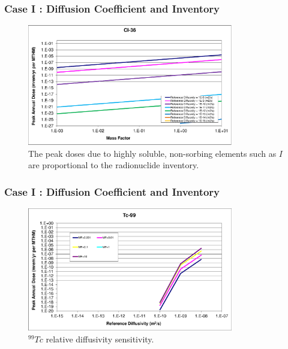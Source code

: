\begin{frame}[c]
  \frametitle{Case I : Diffusion Coefficient and Inventory}

\begin{figure}[ht]
\centering
\includegraphics[width=0.8\textwidth]{DiffCoeffAndInvEBSFail/Cl-36-MF.eps}
\caption{The peak doses due to highly soluble, non-sorbing elements such as $I$ 
are  proportional to the radionuclide inventory.}
\label{fig:DCInvCl36MF}
\end{figure}
\end{frame}


\begin{frame}[c]
  \frametitle{Case I : Diffusion Coefficient and Inventory}
\begin{figure}[ht!]
\centering
\includegraphics[width=0.8\textwidth]{DiffCoeffAndInvEBSFail/Tc-99.eps}
\caption{$^{99}Tc$ relative diffusivity sensitivity.} 
\label{fig:DCInvTc99}
\end{figure}
\end{frame}

